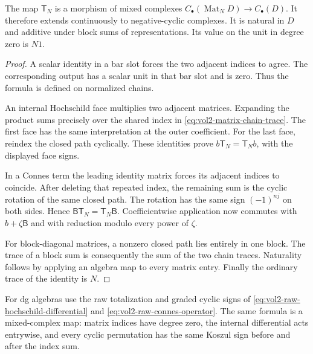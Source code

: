\begin{proposition}\label{prop:vol2-mixed-matrix-trace}
The map $\mathsf T_N$ is a morphism of mixed complexes
$C_\bullet(\operatorname{Mat}_N D)\to C_\bullet(D)$.
It therefore extends continuously to negative-cyclic complexes.
It is natural in $D$ and additive under block sums of
representations. Its value on the unit in degree zero is $N1$.
\end{proposition}
\begin{proof}
A scalar identity in a bar slot forces the two adjacent
indices to agree. The corresponding output has a scalar unit
in that bar slot and is zero. Thus the formula is defined on
normalized chains.

An internal Hochschild face multiplies two adjacent matrices.
Expanding the product sums precisely over the shared index
in \eqref{eq:vol2-matrix-chain-trace}.
The first face has the same interpretation at the outer
coefficient. For the last face, reindex the closed path
cyclically. These identities prove
$b\mathsf T_N=\mathsf T_Nb$, with the displayed face signs.

In a Connes term the leading identity matrix forces its
adjacent indices to coincide. After deleting that repeated
index, the remaining sum is the cyclic rotation of the same
closed path. The rotation has the same sign $(-1)^{nj}$ on
both sides. Hence
$\mathsf B\mathsf T_N=\mathsf T_N\mathsf B$.
Coefficientwise application now commutes with
$b+\zeta\mathsf B$ and with reduction modulo every power of
$\zeta$.

For block-diagonal matrices, a nonzero closed path lies
entirely in one block. The trace of a block sum is consequently
the sum of the two chain traces. Naturality follows by
applying an algebra map to every matrix entry. Finally the
ordinary trace of the identity is $N$.
\end{proof}

For dg algebras use the raw totalization and graded cyclic
signs of
\eqref{eq:vol2-raw-hochschild-differential} and
\eqref{eq:vol2-raw-connes-operator}.
The same formula is a mixed-complex map: matrix indices
have degree zero, the internal differential acts entrywise,
and every cyclic permutation has the same Koszul sign
before and after the index sum.

